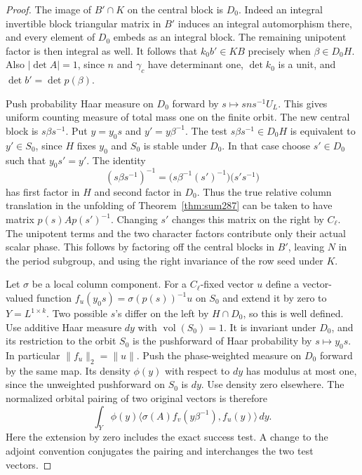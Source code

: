 \documentclass[a4paper,11pt]{article}
\theoremstyle{definition}
\theoremstyle{remark}
\numberwithin{equation}{section}
\begin{document}
\begin{proof}
The image of \(B'\cap K\) on the central block is \(D_0\).
Indeed an integral invertible block triangular matrix in
\(B'\) induces an integral automorphism there, and every
element of \(D_0\) embeds as an integral block. The
remaining unipotent factor is then integral as well.
It follows that \(k_0b'\in KB\) precisely when
\(\beta\in D_0 H\). Also \(|\det A|=1\), since \(n\) and
\(\gamma_c\) have determinant one, \(\det k_0\) is a unit,
and \(\det b'=\det p(\beta)\).

Push probability Haar measure on \(D_0\) forward by
\(s\mapsto sns^{-1}U_L\). This gives uniform counting
measure of total mass one on the finite orbit. The new
central block is \(s\beta s^{-1}\). Put \(y=y_0s\) and
\(y'=y\beta^{-1}\). The test \(s\beta s^{-1}\in D_0H\)
is equivalent to \(y'\in S_0\), since \(H\) fixes
\(y_0\) and \(S_0\) is stable under \(D_0\).
In that case choose \(s'\in D_0\) such that \(y_0s'=y'\).
The identity
\[
     (s\beta s^{-1})^{-1}
       =\bigl(s\beta^{-1}(s')^{-1}\bigr)\bigl(s's^{-1}\bigr)
\]
has first factor in \(H\) and second factor in \(D_0\).
Thus the true relative column translation in the unfolding
of Theorem~\ref{thm:sum287} can be taken to have matrix
\(p(s)A p(s')^{-1}\). Changing \(s'\) changes this matrix
on the right by \(C_\ell\). The unipotent terms and the
two character factors contribute only their actual scalar
phase. This follows by factoring off the central blocks
in \(B'\), leaving \(N\) in the period subgroup, and
using the right invariance of the row seed under \(K\).

Let \(\sigma\) be a local column component. For a
\(C_\ell\)-fixed vector \(u\) define a vector-valued
function \(f_u(y_0s)=\sigma(p(s))^{-1}u\) on \(S_0\)
and extend it by zero to \(Y=L^{1\times k}\).
Two possible \(s\)'s differ on the left by \(H\cap D_0\),
so this is well defined. Use additive Haar measure \(dy\)
with \(\operatorname{vol}(S_0)=1\). It is invariant under
\(D_0\), and its restriction to the orbit \(S_0\) is the
pushforward of Haar probability by \(s\mapsto y_0s\).
In particular \(\|f_u\|_2=\|u\|\). Push the phase-weighted
measure on \(D_0\) forward by the same map. Its density
\(\phi(y)\) with respect to \(dy\) has modulus at most
one, since the unweighted pushforward on \(S_0\) is \(dy\).
Use density zero elsewhere. The normalized orbital pairing
of two original vectors is therefore
\[
       \int_Y \phi(y)
        \langle \sigma(A) f_v(y\beta^{-1}),f_u(y)\rangle\,dy .
\]
Here the extension by zero includes the exact success test.
A change to the adjoint convention conjugates the pairing
and interchanges the two test vectors.


\end{proof}
\end{document}
